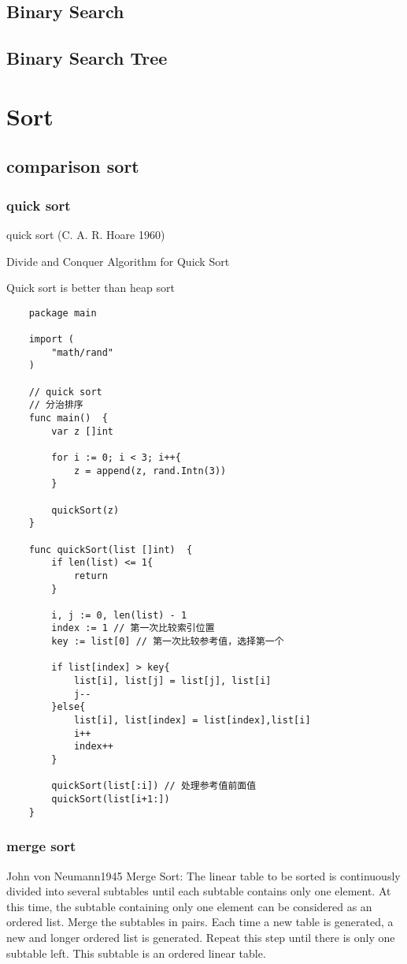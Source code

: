 \documentclass[oneside,12pt,twiside,a4paper]{ctexbook}
\begin{document}
\section{Binary Search}
\section{Binary Search Tree}


\chapter{Sort}
\section{comparison sort}
%
\subsection{quick sort}
quick sort (C. A. R. Hoare 1960) 

Divide and Conquer Algorithm for Quick Sort

Quick sort is better than heap sort
\begin{lstlisting}
    package main

    import (
        "math/rand"
    )
    
    // quick sort
    // 分治排序
    func main()  {
        var z []int
    
        for i := 0; i < 3; i++{
            z = append(z, rand.Intn(3))
        }
        
        quickSort(z)	
    }
    
    func quickSort(list []int)  {
        if len(list) <= 1{
            return
        }
    
        i, j := 0, len(list) - 1
        index := 1 // 第一次比较索引位置
        key := list[0] // 第一次比较参考值，选择第一个
    
        if list[index] > key{
            list[i], list[j] = list[j], list[i]
            j--
        }else{
            list[i], list[index] = list[index],list[i]
            i++
            index++
        }
    
        quickSort(list[:i]) // 处理参考值前面值
        quickSort(list[i+1:])
    }
\end{lstlisting}
%
\subsection{merge sort}
John von Neumann1945
Merge Sort:
The linear table to be sorted is continuously divided into several subtables until each 
subtable contains only one element. 
At this time, the subtable containing only one element can be considered as an ordered list.
Merge the subtables in pairs. Each time a new table is generated, 
a new and longer ordered list is generated. 
Repeat this step until there is only one subtable left. 
This subtable is an ordered linear table.
%
\end{document}
